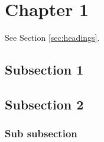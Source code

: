 \section{Chapter 1}

\lipsum[4]

\label{sec:headings}

\lipsum[7] See Section \ref{sec:headings}.

\subsection{Subsection 1}

\lipsum[5]

\subsection{Subsection 2}

\subsubsection{Sub subsection}

\lipsum[6]
